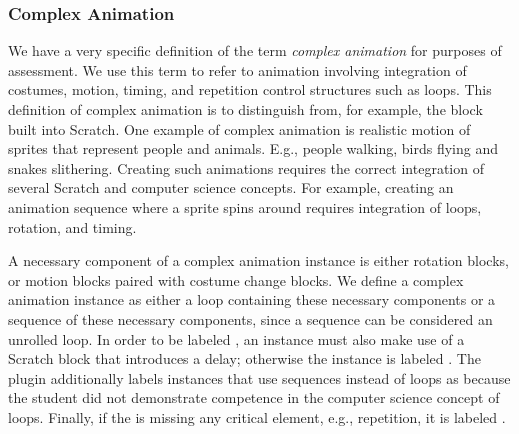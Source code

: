 \subsubsection{Complex Animation}
We have a very specific definition of the term \emph{complex animation} for
purposes of assessment.  We use this term to refer to animation involving
integration of costumes, motion, timing, and repetition control structures such
as loops. This definition of complex animation is to distinguish from, for
example, the \glideto{} block built into Scratch.  One example of complex
animation is realistic motion of sprites that represent people and
animals. E.g., people walking, birds flying and snakes slithering.  Creating
such animations requires the correct integration of several Scratch and
computer science concepts.  For example, creating an animation sequence where a
sprite spins around requires integration of loops, rotation, and timing.

A necessary component of a complex animation instance is either rotation
blocks, or motion blocks paired with costume change blocks. We define a complex
animation instance as either a loop containing these necessary components or a
sequence of these necessary components, since a sequence can be considered an
unrolled loop. In order to be labeled \correct{}, an instance must also make
use of a Scratch block that introduces a delay; otherwise the instance is
labeled \semincor{}. The plugin additionally labels instances that use
sequences instead of loops as \semincor{} because the student did not
demonstrate competence in the computer science concept of loops. Finally, if
the \sprogram{} is missing any critical element, e.g., repetition, it is
labeled \incom{}.
